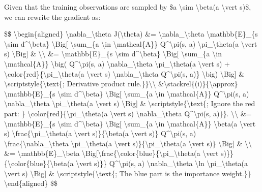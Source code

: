 Given that the training observations are sampled by \$a \textbackslash sim \textbackslash beta(a \textbackslash vert s)\$, we can rewrite the gradient as:

\$\$ \textbackslash begin\{aligned\} \textbackslash nabla\_\textbackslash theta J(\textbackslash theta) \&= \textbackslash nabla\_\textbackslash theta \textbackslash mathbb\{E\}\_\{s \textbackslash sim d\^{}\textbackslash beta\} \textbackslash Big{[} \textbackslash sum\_\{a \textbackslash in \textbackslash mathcal\{A\}\} Q\^{}\textbackslash pi(s, a) \textbackslash pi\_\textbackslash theta(a \textbackslash vert s) \textbackslash Big{]} \& \textbackslash\textbackslash{} \&= \textbackslash mathbb\{E\}\_\{s \textbackslash sim d\^{}\textbackslash beta\} \textbackslash Big{[} \textbackslash sum\_\{a \textbackslash in \textbackslash mathcal\{A\}\} \textbackslash big( Q\^{}\textbackslash pi(s, a) \textbackslash nabla\_\textbackslash theta \textbackslash pi\_\textbackslash theta(a \textbackslash vert s) + \textbackslash color\{red\}\{\textbackslash pi\_\textbackslash theta(a \textbackslash vert s) \textbackslash nabla\_\textbackslash theta Q\^{}\textbackslash pi(s, a)\} \textbackslash big) \textbackslash Big{]} \& \textbackslash scriptstyle\{\textbackslash text\{; Derivative product rule.\}\}\textbackslash\textbackslash{} \&\textbackslash stackrel\{(i)\}\{\textbackslash approx\} \textbackslash mathbb\{E\}\_\{s \textbackslash sim d\^{}\textbackslash beta\} \textbackslash Big{[} \textbackslash sum\_\{a \textbackslash in \textbackslash mathcal\{A\}\} Q\^{}\textbackslash pi(s, a) \textbackslash nabla\_\textbackslash theta \textbackslash pi\_\textbackslash theta(a \textbackslash vert s) \textbackslash Big{]} \& \textbackslash scriptstyle\{\textbackslash text\{; Ignore the red part: \} \textbackslash color\{red\}\{\textbackslash pi\_\textbackslash theta(a \textbackslash vert s) \textbackslash nabla\_\textbackslash theta Q\^{}\textbackslash pi(s, a)\}\}. \textbackslash\textbackslash{} \&= \textbackslash mathbb\{E\}\_\{s \textbackslash sim d\^{}\textbackslash beta\} \textbackslash Big{[} \textbackslash sum\_\{a \textbackslash in \textbackslash mathcal\{A\}\} \textbackslash beta(a \textbackslash vert s) \textbackslash frac\{\textbackslash pi\_\textbackslash theta(a \textbackslash vert s)\}\{\textbackslash beta(a \textbackslash vert s)\} Q\^{}\textbackslash pi(s, a) \textbackslash frac\{\textbackslash nabla\_\textbackslash theta \textbackslash pi\_\textbackslash theta(a \textbackslash vert s)\}\{\textbackslash pi\_\textbackslash theta(a \textbackslash vert s)\} \textbackslash Big{]} \& \textbackslash\textbackslash{} \&= \textbackslash mathbb\{E\}\_\textbackslash beta \textbackslash Big{[}\textbackslash frac\{\textbackslash color\{blue\}\{\textbackslash pi\_\textbackslash theta(a \textbackslash vert s)\}\}\{\textbackslash color\{blue\}\{\textbackslash beta(a \textbackslash vert s)\}\} Q\^{}\textbackslash pi(s, a) \textbackslash nabla\_\textbackslash theta \textbackslash ln \textbackslash pi\_\textbackslash theta(a \textbackslash vert s) \textbackslash Big{]} \& \textbackslash scriptstyle\{\textbackslash text\{; The blue part is the importance weight.\}\} \textbackslash end\{aligned\} \$\$

